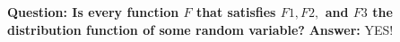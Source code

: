 \documentclass[12pt]{report} \addtolength{\textheight}{2in}
\newcommand{\Borel}{\mathscr{B}}
\newcommand{\Realnum}{\mathbb{R}}
\newcommand{\bigA}{\mathcal{A}}
\newcommand{\probsp}{(\Omega, \bigA, P)}
\begin{document}
\textbf{Question: Is every function $F$ that satisfies $F1,F2,$ and $F3$ the distribution function of some random variable?} 
\textbf{Answer:} YES!\\
%
%


\newpage
\end{document}
